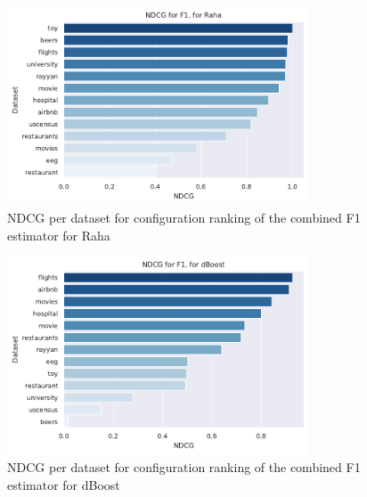 \begin{figure}
    \centering
    \includegraphics[width=0.8\textwidth]{thesis/Figures/RQ3/15_combined_profiler_NDCG_Raha.pdf}
    \caption{NDCG per dataset for configuration ranking of the combined F1 estimator for Raha}
    \label{fig:ndcg_per_config_Raha}
\end{figure}

\begin{figure}
    \centering
    \includegraphics[width=0.8\textwidth]{thesis/Figures/RQ3/15_combined_profiler_NDCG_dBoost.pdf}
    \caption{NDCG per dataset for configuration ranking of the combined F1 estimator for dBoost}
    \label{fig:ndcg_per_config_dBoost}
\end{figure}
